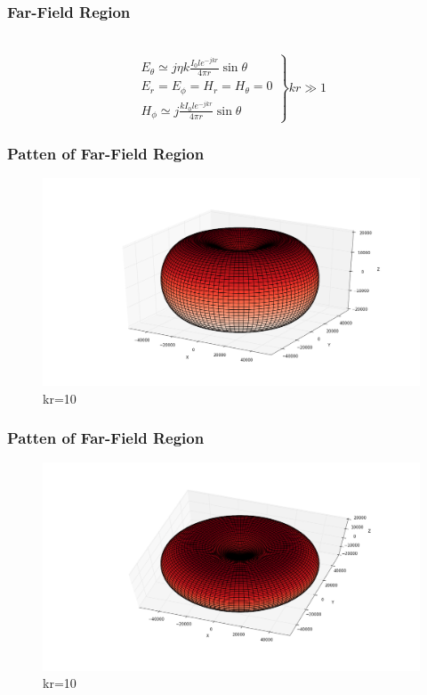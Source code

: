 \documentclass[compress=true]{beamer}
\begin{document}
\begin{frame}
  \frametitle{Far-Field Region}
  \begin{block}{~}
  \begin{equation}
    \left.
      \begin{array}{l}
        E_{\theta} \simeq j{\eta}k\frac{I_0le^{-jkr}}{4\pi r}\sin{\theta}\\
        E_r=E_{\phi}=H_r=H_{\theta}=0\\
        H_{\phi}\simeq j\frac{kI_0le^{-jkr}}{4\pi r}\sin{\theta}
      \end{array}
    \right\} kr\gg 1
  \end{equation}
  \end{block}
\end{frame}
\begin{frame}
  \frametitle{Patten of Far-Field Region}
  \begin{figure}
    \includegraphics[height=0.68\textheight]{far_kr_10_1.png}
    \caption*{\tiny{kr=10}}
  \end{figure}
\end{frame}
\begin{frame}
  \frametitle{Patten of Far-Field Region}
  \begin{figure}
    \includegraphics[height=0.68\textheight]{far_kr_10_2.png}
    \caption*{\tiny{kr=10}}
  \end{figure}
\end{frame}
\end{document}
